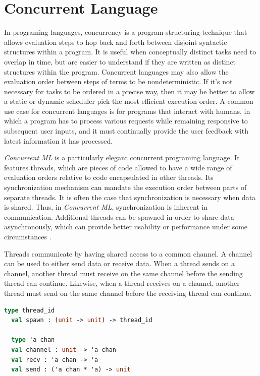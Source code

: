 \documentclass[10pt]{article}
\begin{document}
\section{Concurrent Language}
In programing languages, concurrency is a program structuring technique that allows evaluation
steps to hop back and forth between disjoint syntactic structures within a program.
It is useful
when conceptually distinct tasks need to overlap in time, but are easier to understand if they
are written as distinct structures within the program. Concurrent languages may also allow the
evaluation order between steps of terms to be nondeterministic. If it's not necessary for
tasks to be ordered in a precise way, then it may be better to allow a static or dynamic
scheduler pick the most efficient execution order. A common use case for concurrent languages
is for programs that interact with humans, in which a program has to process various requests
while remaining responsive to subsequent user inputs, and it must continually provide the user
feedback with latest information it has processed.

\textit{Concurrent ML} is a particularly elegant concurrent programing language.
It features threads, which are pieces of code allowed to have a wide range of
evaluation orders relative to code encapsulated in other threads. Its synchronization
mechanism can mandate the execution order between parts of separate threads. It is often the
case that synchronization is necessary when data is shared. Thus, in \textit{Concurrent ML},
synchronization is inherent in communication. Additional threads can be spawned
in order to share data asynchronously, which can provide better usability or performance under
some circumstances \cite{}.

Threads communicate by having shared access to a common channel. A channel can be used to
either send data or receive data.  When a thread sends on a channel, another thread must
receive on the same channel before the sending thread can continue.  Likewise, when a thread
receives on a channel, another thread must send on the same channel before the receiving thread
can continue.

\begin{lstlisting}[language=ML]
  type thread_id
  val spawn : (unit -> unit) -> thread_id

  type 'a chan
  val channel : unit -> 'a chan
  val recv : 'a chan -> 'a
  val send : ('a chan * 'a) -> unit
  \end{lstlisting}
\end{document}

